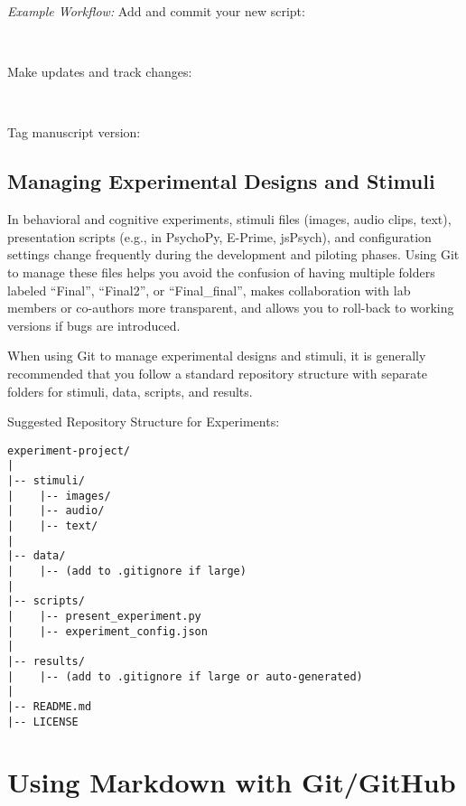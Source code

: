 \noindent \emph{Example Workflow:}
\noindent Add and commit your new script:
\begin{terminal}
\\
\end{terminal}

\noindent Make updates and track changes:
\begin{terminal}
\\
\end{terminal}

\noindent Tag manuscript version:
\begin{terminal}
\end{terminal}

\subsection*{Managing Experimental Designs and Stimuli}
In behavioral and cognitive experiments, stimuli files (images, audio clips, text), presentation scripts (e.g., in PsychoPy, E-Prime, jsPsych), and configuration settings change frequently during the development and piloting phases. Using Git to manage these files helps you avoid the confusion of having multiple folders labeled ``Final'', ``Final2'', or ``Final\_final'', makes collaboration with lab members or co-authors more transparent, and allows you to roll-back to working versions if bugs are introduced.

When using Git to manage experimental designs and stimuli, it is generally recommended that you follow a standard repository structure with separate folders for stimuli, data, scripts, and results.

\noindent Suggested Repository Structure for Experiments:

\begin{verbatim}experiment-project/
|
|-- stimuli/
|    |-- images/
|    |-- audio/
|    |-- text/
|
|-- data/
|    |-- (add to .gitignore if large)
|
|-- scripts/
|    |-- present_experiment.py
|    |-- experiment_config.json
|
|-- results/
|    |-- (add to .gitignore if large or auto-generated)
|
|-- README.md
|-- LICENSE
\end{verbatim}

\section{Using Markdown with Git/GitHub}

